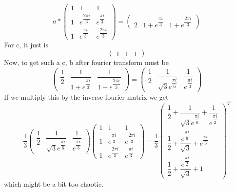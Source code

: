 \documentclass{article}
\begin{document}
\begin{equation}
	a*\begin{pmatrix}
		1 & 1 & 1 \\
		1 & e^{\dfrac{2\pi i}{3}} & e^{\dfrac{\pi i}{3}} \\
		1& e^{\dfrac{\pi i}{3}} & e^{\dfrac{2\pi i}{3}}
	\end{pmatrix}=\begin{pmatrix}
		2 & 1+e^{\dfrac{\pi i}{3}} & 1+e^{\dfrac{2\pi i}{3}}
\end{pmatrix}
\end{equation}
For c, it just is 
\begin{equation}
	\begin{pmatrix}
		1 & 1 & 1
	\end{pmatrix}
\end{equation}
Now, to get such a c, b after fourier transform must be
\begin{equation}
	\begin{pmatrix}
		\dfrac{1}{2} & \dfrac{1}{1+e^{\dfrac{\pi i}{3}}} & \dfrac{1}{1+e^{\dfrac{2\pi i}{3}}}
	\end{pmatrix}=
\begin{pmatrix}
	\dfrac{1}{2} & \dfrac{1}{\sqrt{3}e^{\dfrac{\pi i}{6}}} & \dfrac{1}{e^{\dfrac{\pi i}{3}}}
\end{pmatrix}
\end{equation}
If we multiply this by the inverse fourier matrix we get 
\begin{equation}
	\dfrac{1}{3}
	\begin{pmatrix}
		\dfrac{1}{2} & \dfrac{1}{\sqrt{3}e^{\dfrac{\pi i}{6}}} & \dfrac{1}{e^{\dfrac{\pi i}{3}}}
	\end{pmatrix}
	\begin{pmatrix}
		1 & 1 & 1 \\
		1 & e^{\dfrac{\pi i}{3}} & e^{\dfrac{2\pi i}{3}} \\
		1& e^{\dfrac{2\pi i}{3}} & e^{\dfrac{\pi i}{3}}
	\end{pmatrix}
=
\dfrac{1}{3}
\begin{pmatrix}
	\dfrac{1}{2}+\dfrac{1}{\sqrt{3}e^{\dfrac{\pi i}{6}}}+\dfrac{1}{e^{\dfrac{\pi i}{3}}} \\
	\dfrac{1}{2}+\dfrac{e^{\dfrac{\pi i}{6}}}{\sqrt{3}}+e^{\dfrac{\pi i}{3}} \\
	\dfrac{1}{2}+\dfrac{e^{\dfrac{\pi i}{2}}}{\sqrt{3}}+1
\end{pmatrix}^T
\end{equation}
which might be a bit too chaotic.
\end{document}
